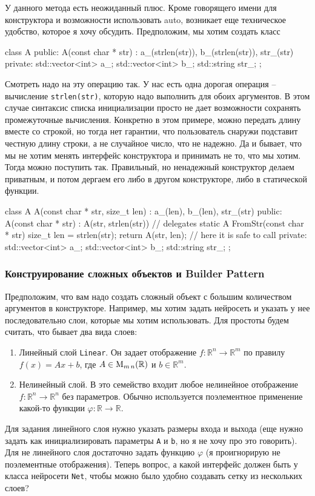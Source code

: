 У данного метода есть неожиданный плюс.
Кроме говорящего имени для конструктора и возможности использовать auto, возникает еще техническое удобство, которое я хочу обсудить.
Предположим, мы хотим создать класс
\begin{cppcode}
class A {
public:
  A(const char * str) : a_(strlen(str)), b_(strlen(str)), str_(str) {}
private:
  std::vector<int> a_;
  std::vector<int> b_;
  std::string str_;
};
\end{cppcode}
Смотреть надо на эту операцию так.
У нас есть одна дорогая операция -- вычисление \verb"strlen(str)", которую надо выполнить для обоих аргументов.
В этом случае синтаксис списка инициализации просто не дает возможности сохранять промежуточные вычисления.
Конкретно в этом примере, можно передать длину вместе со строкой, но тогда нет гарантии, что пользователь снаружи подставит честную длину строки, а не случайное число, что не надежно.
Да и бывает, что мы не хотим менять интерфейс конструктора и принимать не то, что мы хотим.
Тогда можно поступить так.
Правильный, но ненадежный конструктор делаем приватным, и потом дергаем его либо в другом конструкторе, либо в статической функции.
\begin{cppcode}
class A {
  A(const char * str, size_t len) : a_(len), b_(len), str_(str) {}
public:
  A(const char * str) : A(str, strlen(str)) {} // delegates
  static A FromStr(const char * str) {
    size_t len = strlen(str);
    return A(str, len); // here it is safe to call
  }
private:
  std::vector<int> a_;
  std::vector<int> b_;
  std::string str_;
};
\end{cppcode}

\subsubsection{Конструирование сложных объектов и Builder Pattern}
\label{section::Builder}

Предположим, что вам надо создать сложный объект с большим количеством аргументов в конструкторе.
Например, мы хотим задать нейросеть и указать у нее последовательно слои, которые мы хотим использовать.
Для простоты будем считать, что бывает два вида слоев:
\begin{enumerate}
\item Линейный слой \verb"Linear".
Он задает отображение $f\colon \mathbb R^n\to \mathbb R^m$ по правилу $f(x) = Ax + b$, где $A\in \operatorname{M}_{m\,n}(\mathbb R)$ и $b\in \mathbb R^m$.

\item Нелинейный слой.
В это семейство входит любое нелинейное отображение $f\colon \mathbb R^n \to \mathbb R^n$ без параметров.
Обычно используется поэлементное применение какой-то функции $\varphi\colon \mathbb R\to \mathbb R$.
\end{enumerate}
Для задания линейного слоя нужно указать размеры входа и выхода (еще нужно задать как инициализировать параметры \verb"A" и \verb"b", но я не хочу про это говорить).
Для не линейного слоя достаточно задать функцию $\varphi$ (я проигнорирую не поэлементные отображения).
Теперь вопрос, а какой интерфейс должен быть у класса нейросети \verb"Net", чтобы можно было удобно создавать сетку из нескольких слоев?

